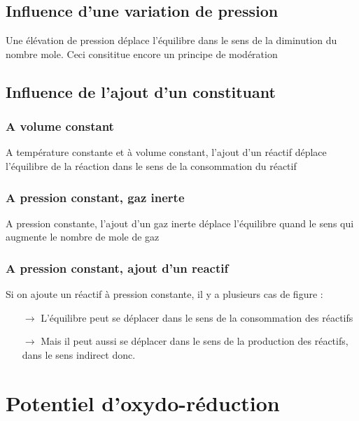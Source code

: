 \subsection{Influence d'une variation de pression}
Une élévation de pression déplace l'équilibre dans le sens de la diminution du nombre mole. Ceci consititue encore un principe de modération
\subsection{Influence de l'ajout d'un constituant}
\subsubsection{A volume constant}
A température constante et à volume constant, l'ajout d'un réactif déplace l'équilibre de la réaction dans le sens de la consommation du réactif
\subsubsection{A pression constant, gaz inerte}
A pression constante, l'ajout d'un gaz inerte déplace l'équilibre quand le sens qui augmente le nombre de mole de gaz 
\subsubsection{A pression constant, ajout d'un reactif}
Si on ajoute un réactif à pression constante, il y a plusieurs cas de figure :
\begin{itemize}
 \item[$\rightarrow$] L'équilibre peut se déplacer dans le sens de la consommation des réactifs
 \item[$\rightarrow$] Mais il peut aussi se déplacer dans le sens de la production des réactifs, dans le sens indirect donc.
\end{itemize}
\section{Potentiel d'oxydo-réduction}

